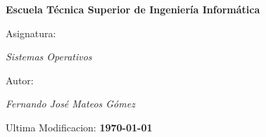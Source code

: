 \begin{titlepage}
        \centering
        {\bfseries\LARGE Escuela Técnica Superior de Ingeniería Informática \par}
        \vspace{1cm}
        {\Large Asignatura: \par \textit{Sistemas Operativos} \par}
        \vspace{1cm}
        {\Large Autor: \par \textit{Fernando José Mateos Gómez} \par}
        \vspace{2cm}
        {\Large Ultima Modificacion: \textbf{\today} \par}
        \vspace{2cm}
\end{titlepage}
\restoregeometry